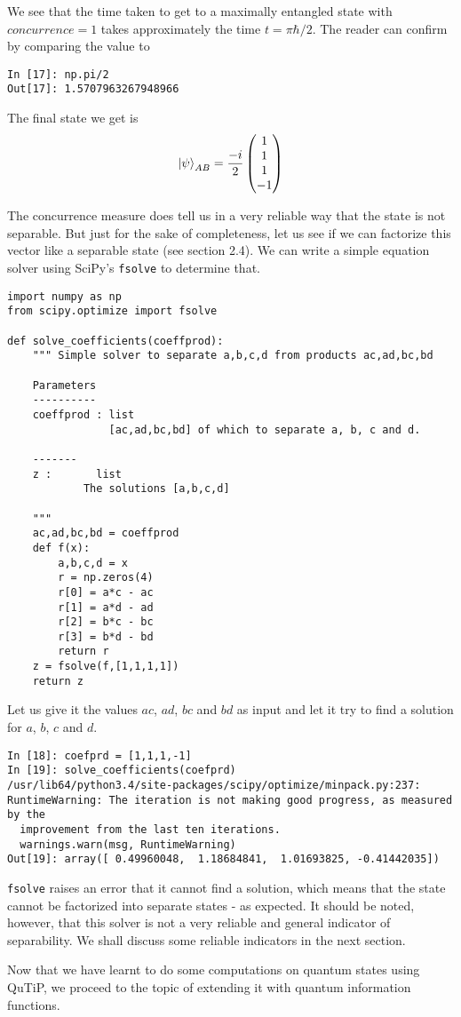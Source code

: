 \par We see that the time taken to get to a maximally entangled state with $concurrence = 1$ takes approximately the time $t = \pi\hbar/2$. The reader can confirm by comparing the value to
\begin{verbatim}
In [17]: np.pi/2
Out[17]: 1.5707963267948966
\end{verbatim}
\par The final state we get is
\begin{align*}
\ket{\psi}_{AB} = \frac{-i}{2} \begin{pmatrix} 1\\1\\1\\-1 \end{pmatrix}
\end{align*}
\par The concurrence measure does tell us in a very reliable way that the state is not separable. But just for the sake of completeness, let us see if we can factorize this vector like a separable state (see section 2.4). We can write a simple equation solver using SciPy's \texttt{fsolve} to determine that.
\begin{verbatim}
import numpy as np
from scipy.optimize import fsolve

def solve_coefficients(coeffprod):
    """ Simple solver to separate a,b,c,d from products ac,ad,bc,bd
    
    Parameters
    ----------
    coeffprod : list
                [ac,ad,bc,bd] of which to separate a, b, c and d.
    
    -------
    z :       list
            The solutions [a,b,c,d]
    
    """
    ac,ad,bc,bd = coeffprod
    def f(x):
        a,b,c,d = x
        r = np.zeros(4)
        r[0] = a*c - ac
        r[1] = a*d - ad
        r[2] = b*c - bc
        r[3] = b*d - bd
        return r
    z = fsolve(f,[1,1,1,1])
    return z
\end{verbatim}
Let us give it the values $ac$, $ad$, $bc$ and $bd$ as input and let it try to find a solution for $a$, $b$, $c$ and $d$.
\begin{verbatim}
In [18]: coefprd = [1,1,1,-1]
In [19]: solve_coefficients(coefprd)
/usr/lib64/python3.4/site-packages/scipy/optimize/minpack.py:237: 
RuntimeWarning: The iteration is not making good progress, as measured by the 
  improvement from the last ten iterations.
  warnings.warn(msg, RuntimeWarning)
Out[19]: array([ 0.49960048,  1.18684841,  1.01693825, -0.41442035])
\end{verbatim}
\texttt{fsolve} raises an error that it cannot find a solution, which means that the state cannot be factorized into separate states - as expected. It should be noted, however, that this solver is not a very reliable and general indicator of separability. We shall discuss some reliable indicators in the next section.\\

\par Now that we have learnt to do some computations on quantum states using QuTiP, we proceed to the topic of extending it with quantum information functions.

